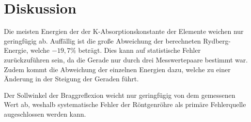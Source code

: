 \section{Diskussion}
\label{sec:Diskussion}
Die meisten Energien der der K-Absorptionskonstante der Elemente weichen nur geringfügig ab.
Auffällig ist die große Abweichung der berechneten Rydberg-Energie, welche $-19,7\%$ beträgt. Dies kann auf statistische
Fehler zurückzuführen sein, da die Gerade nur durch drei Messwertepaare bestimmt war. Zudem kommt die Abweichung der einzelnen
Energien dazu, welche zu einer Änderung in der Steigung der Geraden führt.

Der Sollwinkel der Braggreflexion weicht nur geringfügig von dem gemessenen Wert ab, weshalb systematische Fehler der
Röntgenröhre als primäre Fehlerquelle augeschlossen werden kann.
